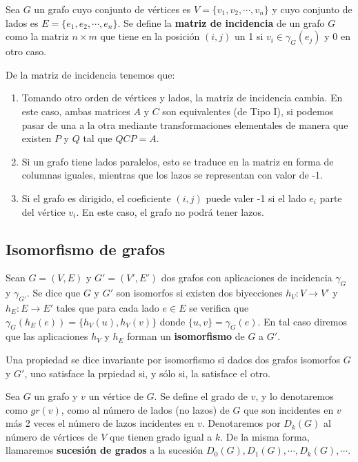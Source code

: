 \begin{ndef}
    Sea $G$ un grafo cuyo conjunto de vértices es $V=\{v_1,v_2,\cdots,v_n\}$ y cuyo conjunto de lados es $E=\{e_1,e_2,\cdots,e_n\}$. Se define la \textbf{matriz de incidencia} de un grafo $G$ como la matriz $n \times m$ que tiene en la posición $(i,j)$ un 1 si $v_i \in \gamma_G(e_j)$ y 0 en otro caso.
\end{ndef}
\begin{obs}
    De la matriz de incidencia tenemos que:
    \begin{enumerate}
        \item Tomando otro orden de vértices y lados, la matriz de incidencia cambia. En este caso, ambas matrices $A$ y $C$ son equivalentes (de Tipo I), si podemos pasar de una a la otra mediante transformaciones elementales de manera que existen $P$ y $Q$ tal que $QCP=A$.
        \item Si un grafo tiene lados paralelos, esto se traduce en la matriz en forma de columnas iguales, mientras que los lazos se representan con valor de -1.
        \item Si el grafo es dirigido, el coeficiente $(i,j)$ puede valer -1 si el lado $e_i$ parte del vértice $v_i$. En este caso, el grafo no podrá tener lazos.
    \end{enumerate}
\end{obs}

\subsection{Isomorfismo de grafos}
\begin{ndef}
    Sean $G=(V,E)$ y $G'=(V',E')$ dos grafos con aplicaciones de incidencia $\gamma_G$ y $\gamma_{G'}$.
    Se dice que $G$ y $G'$ son isomorfos si existen dos biyecciones $h_V: V \rightarrow V'$ y $h_E:E \rightarrow E'$ tales que para cada
    lado $e \in E$ se verifica que $\gamma_G(h_E(e))=\{h_V(u), h_V(v)\}$ donde $\{u,v\}=\gamma_G(e)$.
    En tal caso diremos que las aplicaciones $h_V$ y $h_E$ forman un \textbf{isomorfismo} de $G$ a $G'$.
\end{ndef}

\begin{ndef}
    Una propiedad se dice invariante por isomorfismo si dados dos grafos isomorfos $G$ y $G'$, uno satisface la prpiedad si, y sólo si, la satisface el otro.
\end{ndef}

\begin{ndef}
    Sea $G$ un grafo y $v$ un vértice de $G$. Se define el grado de $v$, y lo denotaremos como $gr(v)$,
    como al número de lados (no lazos) de $G$ que son incidentes en $v$ más 2 veces el número de lazos incidentes en $v$.
    Denotaremos por $D_k(G)$ al número de vértices de $V$ que tienen grado igual a $k$. De la misma forma, llamaremos \textbf{sucesión de grados} a la sucesión $D_0(G), D_1(G), \cdots, D_k(G), \cdots$.
\end{ndef}


